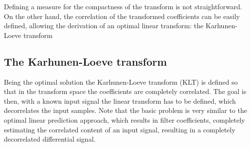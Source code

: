 Defining a measure for the compactness of the transform is not straightforward.
On the other hand, the correlation of the transformed coefficients can be easily defined, allowing the derivation of an optimal linear transform: the Karhunen-Loeve transform

\subsection{The Karhunen-Loeve transform}

Being the optimal solution the Karhunen-Loeve transform (KLT) is defined so that in the transform space the coefficients are completely correlated.
The goal is then, with a known input signal the linear transform has to be defined, which decorrelates the input samples.
Note that the basic problem is very similar to the optimal linear prediction approach, which results in filter coefficients, completely estimating the correlated content of an input signal, resulting in a completely decorrelated differential signal.

